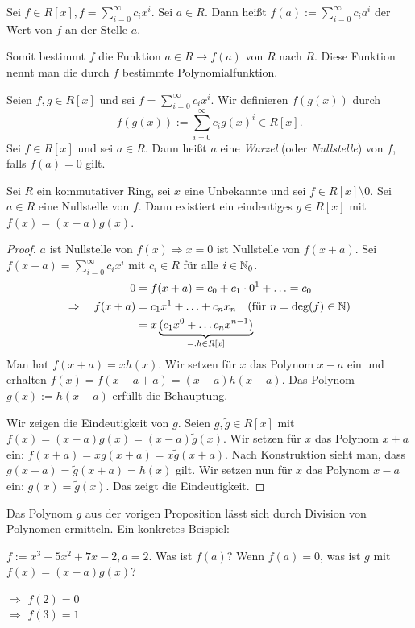 \noindent Sei $ f \in R[x], f = \sum_{i = 0}^{\infty} c_ix^i $. Sei $ a \in R $. Dann heißt $ f(a) := \sum_{i = 0}^{\infty} c_ia^i $ der Wert von $ f $ an der Stelle $ a $.

Somit bestimmt $ f $ die Funktion $ a \in R \mapsto f(a) $ von $ R $ nach $ R $. Diese Funktion nennt man die durch $ f $ bestimmte Polynomialfunktion.

Seien $ f,g \in R[x] $ und sei $ f = \sum_{i = 0}^{\infty} c_ix^i $. Wir definieren $ f(g(x)) $ durch
\begin{equation*}
	f(g(x)) := \sum\limits_{i = 0}^{\infty} c_ig(x)^i \in R[x].
\end{equation*}
Sei $ f \in R[x] $ und sei $ a \in R $. Dann heißt $ a $ eine \emph{Wurzel} (oder \emph{Nullstelle}) von $ f $, falls $ f(a) = 0 $ gilt.

\begin{propn}
	Sei $ R $ ein kommutativer Ring, sei $ x $ eine Unbekannte und sei $ f \in R[x] \setminus { 0 } $. Sei $ a \in R $ eine Nullstelle von $ f $. Dann existiert ein eindeutiges $ g \in R[x] $ mit $ f(x) = (x-a)g(x) $.
\end{propn}
\begin{proof}
	$ a $ ist Nullstelle von $ f(x) \Rightarrow x=0 $  ist Nullstelle von $ f(x+a) $. Sei $ f(x+a) = \sum_{i=0}^{\infty} c_ix^i $ mit $ c_i \in R $ für alle $ i \in \mathbb N_0 $.
	\begin{align*}
		0 &= f(x+a) = c_0 + c_1 \cdot 0^1 + \ldots = c_0 \\
		\Rightarrow \quad f(x+a) &= c_1x^1 + \ldots + c_nx_n \quad \text{(für $ n = \deg(f) \in \mathbb N $)} \\
		&= x \underbrace{(c_1x^0 + \ldots c_nx^{n-1})}_{=: h \in R[x]}
	\end{align*}
	Man hat $ f(x+a) = x h(x) $. Wir setzen für $ x $ das Polynom $ x-a $ ein und erhalten $ f(x) = f(x-a+a) = (x-a)h(x-a) $. Das Polynom $ g(x) := h(x-a) $ erfüllt die Behauptung.
	
	Wir zeigen die Eindeutigkeit von $ g $. Seien $ g, \widetilde{g} \in R[x] $ mit $ f(x) = (x-a)g(x) = (x-a)\widetilde{g}(x) $.
	Wir setzen für $ x $ das Polynom $ x+a $ ein: $ f(x+a) = xg(x+a) = x\widetilde{g}(x+a) $.
	Nach Konstruktion sieht man, dass $ g(x+a) = \widetilde{g}(x+a) = h(x) $ gilt. Wir setzen nun für $ x $ das Polynom $ x-a $ ein: $ g(x) = \widetilde{g}(x) $. Das zeigt die Eindeutigkeit.
\end{proof}

\begin{bem}
	Das Polynom $ g $ aus der vorigen Proposition lässt sich durch Division von Polynomen ermitteln. Ein konkretes Beispiel:
\end{bem}
\begin{bsp}
	$ f := x^3 - 5x^2 + 7x - 2, a = 2 $. Was ist $ f(a) $? Wenn $ f(a) = 0 $, was ist $ g $ mit $ f(x) = (x-a)g(x) $?
	
	\begin{center} 
	 \qquad $\Longrightarrow$ \qquad $f(2)=0$
	\\
	 \qquad $\Longrightarrow$ \qquad $f(3)=1$
	\end{center}
\end{bsp}

